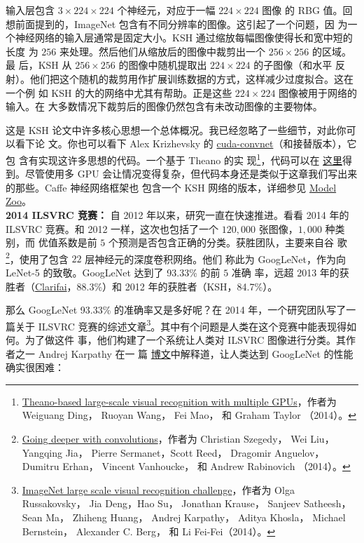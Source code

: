 输入层包含 $3 \times 224 \times 224$ 个神经元，对应于一幅 $224 \times 224$ 图像
的 RBG 值。回想前面提到的，ImageNet 包含有不同分辨率的图像。这引起了一个问题，因
为一个神经网络的输入层通常是固定大小。KSH 通过缩放每幅图像使得长和宽中短的长度
为 $256$ 来处理。然后他们从缩放后的图像中裁剪出一个 $256 \times 256$ 的区域。最
后，KSH 从 $256 \times 256$ 的图像中随机提取出 $224 \times 224$ 的子图像（和水平
反射）。他们把这个随机的裁剪用作扩展训练数据的方式，这样减少过度拟合。这在一个例
如 KSH 的大的网络中尤其有帮助。正是这些 $224 \times 224$ 图像被用于网络的输入。在
大多数情况下裁剪后的图像仍然包含有未改动图像的主要物体。

这是 KSH 论文中许多核心思想一个总体概况。我已经忽略了一些细节，对此你可以看下论
文。你也可以看下 Alex Krizhevsky 的
\href{https://code.google.com/p/cuda-convnet/}{cuda-convnet}（和接替版本），它包
含有实现这许多思想的代码。一个基于 Theano 的实
现\footnote{\href{http://arxiv.org/abs/1412.2302}{Theano-based large-scale
    visual recognition with multiple GPUs}，作者为 Weiguang Ding， Ruoyan Wang，
  Fei Mao， 和 Graham Taylor （2014）。}，代码可以在%
\href{https://github.com/uoguelph-mlrg/theano_alexnet}{这里}得到。尽管使用多 GPU
会让情况变得复杂，但代码本身还是类似于这章我们写出来的那些。Caffe 神经网络框架也
包含一个 KSH 网络的版本，详细参见
\href{http://caffe.berkeleyvision.org/model_zoo.html}{Model Zoo}。\\

\textbf{2014 ILSVRC 竞赛：} 自 2012 年以来，研究一直在快速推进。看看 2014 年的
ILSVRC 竞赛。和 2012 一样，这次也包括了一个 $120,000$ 张图像，$1,000$ 种类别，而
优值系数是前 $5$ 个预测是否包含正确的分类。获胜团队，主要来自谷
歌\footnote{\href{http://arxiv.org/abs/1409.4842}{Going deeper with
    convolutions}，作者为 Christian Szegedy， Wei Liu， Yangqing Jia， Pierre
  Sermanet，Scott Reed， Dragomir Anguelov， Dumitru Erhan， Vincent Vanhoucke，
  和 Andrew Rabinovich （2014）。}，使用了包含 $22$ 层神经元的深度卷积网络。他们
称此为 GoogLeNet，作为向 LeNet-5 的致敬。GoogLeNet 达到了 93.33\% 的前 $5$ 准确
率，远超 2013 年的获胜者（\href{http://www.clarifai.com/}{Clarifai}，88.3\%）和
2012 年的获胜者（KSH，84.7\%）。

那么 GoogLeNet 93.33\% 的准确率又是多好呢？在 2014 年，一个研究团队写了一篇关于
ILSVRC 竞赛的综述文章\footnote{\href{http://arxiv.org/abs/1409.0575}{ImageNet
    large scale visual recognition challenge}，作者为 Olga Russakovsky， Jia
  Deng，Hao Su， Jonathan Krause， Sanjeev Satheesh， Sean Ma， Zhiheng Huang，
  Andrej Karpathy， Aditya Khosla， Michael Bernstein， Alexander C. Berg， 和
  Li Fei-Fei（2014）。}。其中有个问题是人类在这个竞赛中能表现得如何。为了做这件
事，他们构建了一个系统让人类对 ILSVRC 图像进行分类。其作者之一 Andrej Karpathy
在一
篇%
\href{http://karpathy.github.io/2014/09/02/what-i-learned-from-competing-against-a-convnet-on-imagenet/}{%
  博文}中解释道，让人类达到 GoogLeNet 的性能确实很困难：

